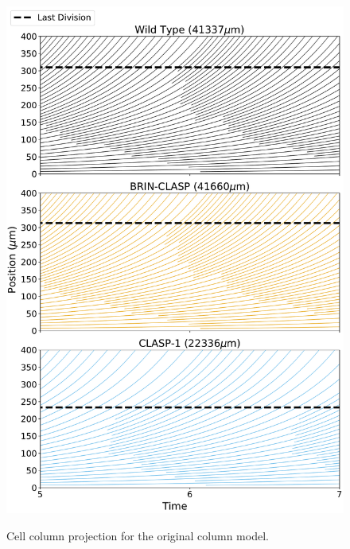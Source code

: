 \documentclass[referee,pdflatex,sn-mathphys-num]{sn-jnl}
\begin{document}
\begin{appendices}
\begin{figure}
  \centering
  \includegraphics[height=500pt]{column-original-profile.pdf}
  \caption{Cell column projection for the original column model.}
\end{figure}


\end{appendices}
\end{document}
